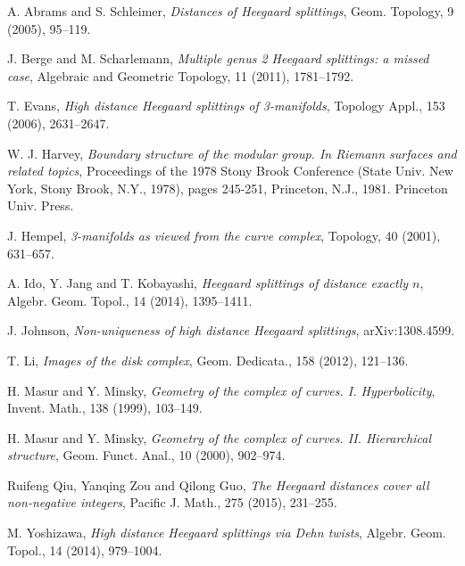 \documentclass[]{aspm}
\begin{document}
\begin{thebibliography}{99}


A. Abrams and S. Schleimer,
{\it Distances of Heegaard splittings}, 
Geom. Topology, 9 (2005), 95--119.




J. Berge and M. Scharlemann, 
{\it Multiple genus 2 Heegaard splittings: a missed case}, 
Algebraic and Geometric Topology, 11 (2011), 1781--1792.

T. Evans, 
{\it High distance Heegaard splittings of 3-manifolds}, 
Topology Appl., 153 (2006), 2631--2647.


W. J. Harvey, 
{\it Boundary structure of the modular group. In Riemann
surfaces and related topics}, Proceedings of the 1978 Stony Brook Conference
(State Univ. New York, Stony Brook, N.Y., 1978), pages 245-251, Princeton,
N.J., 1981. Princeton Univ. Press.

 J. Hempel, 
{\it 3-manifolds as viewed from the curve complex}, 
Topology, 40 (2001), 631--657.

A. Ido, Y. Jang and T. Kobayashi,
{\it Heegaard splittings of distance exactly $n$}, 
Algebr. Geom. Topol., 14 (2014), 1395--1411.

J. Johnson,
{\it Non-uniqueness of high distance Heegaard splittings}, 
arXiv:1308.4599.



T. Li,
{\it Images of the disk complex}, 
Geom. Dedicata., 158 (2012), 121--136.


H. Masur and Y. Minsky,
{\it Geometry of the complex of curves. I. Hyperbolicity}, 
Invent. Math., 138 (1999), 103--149.

H. Masur and Y. Minsky,
{\it Geometry of the complex of curves. II. Hierarchical structure}, 
Geom. Funct. Anal., 10 (2000), 902--974.


Ruifeng Qiu, Yanqing Zou and Qilong Guo,
{\it The Heegaard distances cover all non-negative integers}, 
Pacific J. Math., 275 (2015), 231--255.



M. Yoshizawa,
{\it High distance Heegaard splittings via Dehn twists}, 
Algebr. Geom. Topol., 14 (2014), 979--1004.

\end{thebibliography}
\end{document}
